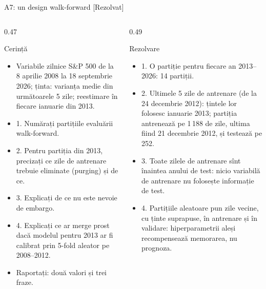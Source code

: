 \begin{frame}{A7: un design walk-forward [Rezolvat]}
\itemsize{\scriptsize}
\begin{columns}[T]
\begin{column}{0.47\textwidth}
\begin{block}{Cerință}
\begin{itemize}
    \item Variabile zilnice S\&P 500 de la 8 aprilie 2008 la 18 septembrie 2026; ținta: varianța medie din următoarele 5 zile; reestimare în fiecare ianuarie din 2013.
    \item 1. Numărați partițiile evaluării walk-forward.
    \item 2. Pentru partiția din 2013, precizați ce zile de antrenare trebuie eliminate (purging) și de ce.
    \item 3. Explicați de ce nu este nevoie de embargo.
    \item 4. Explicați ce ar merge prost dacă modelul pentru 2013 ar fi calibrat prin 5-fold aleator pe 2008--2012.
    \item Raportați: două valori și trei fraze.
\end{itemize}
\end{block}
\end{column}
\begin{column}{0.49\textwidth}
\begin{exampleblock}{Rezolvare}
\begin{itemize}
    \item 1. O partiție pentru fiecare an 2013--2026: 14 partiții.
    \item 2. Ultimele 5 zile de antrenare (de la 24 decembrie 2012): țintele lor folosesc ianuarie 2013; partiția antrenează pe 1\,188 de zile, ultima fiind 21 decembrie 2012, și testează pe 252.
    \item 3. Toate zilele de antrenare sînt înaintea anului de test: nicio variabilă de antrenare nu folosește informație de test.
    \item 4. Partițiile aleatoare pun zile vecine, cu ținte suprapuse, în antrenare și în validare: hiperparametrii aleși recompensează memorarea, nu prognoza.
\end{itemize}
\end{exampleblock}
\end{column}
\end{columns}
\end{frame}

